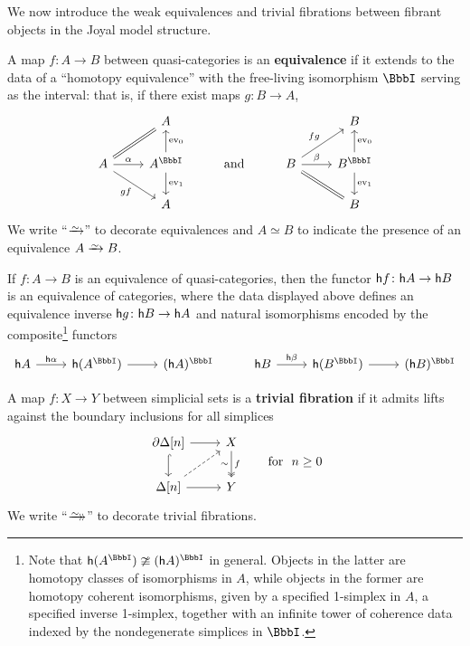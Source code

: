 We now introduce the weak equivalences and trivial fibrations between fibrant objects in the Joyal model structure.

\begin{defn}\label{defn:qcat-equiv} A map $f \colon A \to B$ between quasi-categories is an \textbf{equivalence} if it extends to the data of a ``homotopy equivalence'' with the free-living isomorphism $\iso$ serving as the interval: that is, if there exist maps $g \colon B \to A$,
  \[
  \begin{tikzcd} & A & &  & B \\ A \arrow[ur, equals] \arrow[dr, "gf"'] \arrow[r, "\alpha"] & A^\iso  \arrow[u, "\ev_0"'] \arrow[d, "\ev_1"] & \text{and} &  B \arrow[dr, equals] \arrow[r, "\beta"] \arrow[ur, "fg"] & B^\iso \arrow[u, "\ev_0"'] \arrow[d, "\ev_1"] \\ & A & &  & B
  \end{tikzcd}
  \]
  We write ``$\we$'' to decorate equivalences and $A \simeq B$ to indicate the presence of an equivalence $A \we B$.
  \end{defn}

  \begin{rmk}\label{rmk:qcat-htpy-cat-equiv} If $f \colon A \to B$ is an equivalence of quasi-categories, then the functor ${\mathord{\mathsf{h}}}{f} \colon {\mathord{\mathsf{h}}}{A} \to {\mathord{\mathsf{h}}}{B}$ is an equivalence of categories, where the data displayed above defines an equivalence inverse ${\mathord{\mathsf{h}}}{g} \colon {\mathord{\mathsf{h}}}{B} \to {\mathord{\mathsf{h}}}{A}$ and natural isomorphisms encoded by the composite\footnote{Note that $\ho(A^\iso) \ncong (\ho{A})^\iso$ in general. Objects in the latter are homotopy classes of isomorphisms in $A$, while objects in the former are homotopy coherent isomorphisms, given by a specified 1-simplex in $A$, a specified inverse 1-simplex, together with an infinite tower of coherence data indexed by the nondegenerate simplices in $\iso$.} functors
  \[ \begin{tikzcd} \ho{A} \arrow[r, "\ho{\alpha}"] & \ho(A^\iso) \arrow[r] & (\ho{A})^\iso & \ho{B} \arrow[r, "\ho{\beta}"] & \ho(B^\iso) \arrow[r] & (\ho{B})^\iso \end{tikzcd}
  \]
  \end{rmk}

  \begin{defn}\label{defn:qcat-trivial-fib} A map $f \colon X \to Y$ between simplicial sets is a \textbf{trivial fibration} if it admits lifts against the boundary inclusions for all simplices
  \begin{equation}\label{eq:qcat-trivial-fib}
  \begin{tikzcd}\partial\Delta[n] \arrow[r] \arrow[d, hook] & X \arrow[d, two heads, "\sim"', "f"]  \\ \Delta[n] \arrow[r] \arrow[ur, dashed] & Y
  \end{tikzcd} \qquad \text{for}\ \ n \geq 0
  \end{equation}
  We write ``$\trvfib$'' to decorate trivial fibrations.
  \end{defn}

